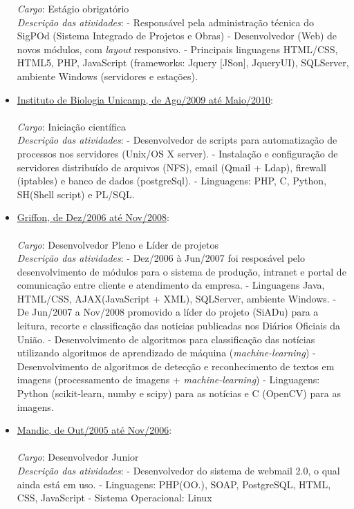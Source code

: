 \documentclass[a4paper,11pt]{article}
\begin{document}
\begin{itemize}
{  \emph{Cargo}: Estágio obrigatório\\
  \emph{Descrição das atividades}: 
  \subitem - Responsável pela administração técnica do SigPOd (Sistema Integrado de Projetos e Obras)
  \subitem - Desenvolvedor (Web) de novos módulos, com \textit{layout} responsivo.
  \subitem - Principais linguagens {HTML/CSS, HTML5, PHP, JavaScript (frameworks: Jquery [JSon], JqueryUI), SQLServer}, ambiente Windows (servidores e estações).
}  
\item \underline{Instituto de Biologia Unicamp, de Ago/2009 até Maio/2010}: \\
  {\small \\ 
  \emph{Cargo}: Iniciação científica\\
  \emph{Descrição das atividades}: 
  \subitem - Desenvolvedor de scripts para automatização de processos nos servidores (Unix/OS X server).
  \subitem - Instalação e configuração de servidores distribuído de arquivos (NFS), email (Qmail + Ldap), firewall (iptables) e banco de dados (postgreSql).
  \subitem - Linguagens:  PHP, C, Python, SH(Shell script) e PL/SQL.\\
}

\item \underline{Griffon, de Dez/2006 até Nov/2008}: \\
{\small \\ 
  \emph{Cargo}: Desenvolvedor Pleno e Líder de projetos\\
  \emph{Descrição das atividades}: 
  \subitem - Dez/2006 à Jun/2007 foi resposável pelo desenvolvimento de módulos para o sistema de produção, intranet e portal de comunicação entre cliente e atendimento da empresa. 
  \subsubitem - Linguagens {Java, HTML/CSS, AJAX(JavaScript + XML), SQLServer}, ambiente Windows.
  \subitem - De Jun/2007 a Nov/2008 promovido a líder do projeto (SiADu) para a leitura, recorte e classificação das noticias publicadas nos Diários Oficiais da União.
	\subsubitem - Desenvolvimento de algoritmos para classificação das notícias utilizando algoritmos de aprendizado de máquina (\textit{machine-learning})
	\subsubitem - Desenvolvimento de algoritmos de detecção e reconhecimento de textos em imagens (processamento de imagens + \textit{machine-learning})
	\subsubitem - Linguagens: Python (scikit-learn, numby e scipy) para as notícias e C (OpenCV) para as imagens.\\
}
\item \underline{Mandic, de Out/2005 até Nov/2006}:\\
{\small \\ 
	  \emph{Cargo}: Desenvolvedor Junior\\
	  \emph{Descrição das atividades}: 
	  \subitem - Desenvolvedor do sistema de webmail 2.0, o qual ainda está em uso. 
	  \subitem - Linguagens: PHP(OO.), SOAP, PostgreSQL, HTML, CSS, JavaScript 
	  \subitem - Sistema Operacional: Linux
}


\end{itemize}
\end{document}
